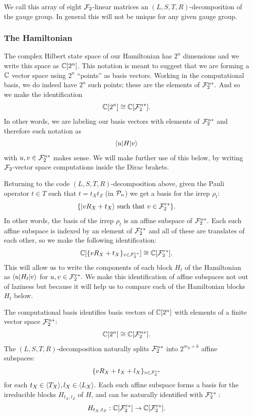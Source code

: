 We call this array of eight $\mathcal{F}_2$-linear 
matrices
an $(L,S,T,R)$-decomposition of the gauge group.
In general this will not be unique for
any given gauge group.

\subsubsection{The Hamiltonian}

The complex Hilbert state space of our
Hamiltonian has $2^n$ dimensions and we
write this space as $\mathbb{C}[2^n]$.
This notation is meant to suggest that
we are forming a $\mathbb{C}$ vector space
using $2^n$ ``points'' 
as basis vectors.
Working in the computational basis,
we do indeed have $2^n$ such points; 
these are the elements of $\mathcal{F}_2^{n*}.$
And so we make the identification
$$
    \mathbb{C}[2^n] \cong \mathbb{C}[\mathcal{F}_2^{n*}].
$$
In other words, we are labeling 
our basis vectors with elements of $\mathcal{F}_2^{n*}$
and therefore such notation as
$$
    \langle{u}| H |{v}\rangle
$$
with $u, v \in \mathcal{F}_2^{n*}$ makes sense.
We will make further use of this below,
by writing  $\mathcal{F}_2$-vector space 
computations inside the Dirac brakets.

Returning to the code $(L,S,T,R)$-decomposition
above,
given the Pauli operator $t\in T$ such that $t = t_X t_Z$ (in $\mathcal{P}_n$)
we get a basis for the irrep $\rho_t$:
$$
    \{ |{v R_X + t_X}\rangle \ \mbox{such that}\  v \in \mathcal{F}_2^{r*} \}.
$$
In other words,
the basis of the irrep $\rho_t$ is 
an affine subspace of $\mathcal{F}_2^{n*}.$
Each such affine subspace is indexed by an
element of $\mathcal{F}_2^{r*}$ and
all of these are
translates of each other,
so we make the following identification:
$$
\mathbb{C}[\{vR_X+t_X\}_{v\in\mathcal{F}_2^{r*}}]
\cong \mathbb{C}[\mathcal{F}_2^{r*}].
$$
This will allow us to write the components
of each block $H_t$ of the Hamiltonian
as $\langle{u}|H_t|{v}\rangle$ for $u,v\in\mathcal{F}_2^{r*}.$
We make this identification of affine subspaces
not out of laziness but because it will
help us to compare each of
the Hamiltonian blocks $H_t$ below.

\begin{framed}
The computational basis identifies
basis vectors of $\mathbb{C}[2^n]$
with elements of a finite vector space $\mathcal{F}_2^{n*}$:
$$
    \mathbb{C}[2^n] \cong \mathbb{C}[\mathcal{F}_2^{n*}].
$$
The $(L,S,T,R)$-decomposition naturally
splits $\mathcal{F}_2^{n*}$ into $2^{m_Z+k}$ affine subspaces:
$$
    \{ v R_X + t_X + l_X \}_{v\in\mathcal{F}_2^{r*}}
$$
for each $t_X \in \langle T_X \rangle, l_X \in \langle L_X \rangle.$
Each such affine subspace forms a basis
for the irreducible blocks $H_{t_X,t_Z}$ of $H$,
and can be naturally identified with $\mathcal{F}_2^{r*}:$
$$
    H_{t_X,t_Z} : \mathbb{C}[\mathcal{F}_2^{r*}] \to \mathbb{C}[\mathcal{F}_2^{r*}].
$$
\end{framed}

